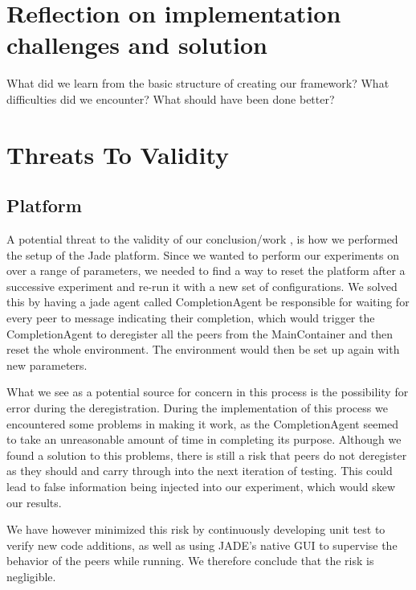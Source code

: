 \section{Reflection on implementation challenges and solution}
What did we learn from the basic structure of creating our framework?
What difficulties did we encounter?
What should have been done better? 

\section{Threats To Validity}

\subsection{Platform}
A potential threat to the validity of our conclusion/work , is how we performed the setup of the Jade platform. Since we wanted to perform our experiments on over a range of parameters, we needed to find a way to reset the platform after a successive experiment and re-run it with a new set of configurations. We solved this by having a jade agent called CompletionAgent be responsible for waiting for every peer to message indicating their completion, which would trigger the CompletionAgent to deregister all the peers from the MainContainer and then reset the whole environment. The environment would then be set up again with new parameters. 

What we see as a potential source for concern in this process is the possibility for error during the deregistration. During the implementation of this process we encountered some problems in making it work, as the CompletionAgent seemed to take an unreasonable amount of time in completing its purpose. Although we found a solution to this problems, there is still a risk that peers do not deregister as they should and carry through into the next iteration of testing. This could lead to false information being injected into our experiment, which would skew our results.  

We have however minimized this risk by continuously developing unit test to verify new code additions, as well as using JADE's native GUI to supervise the behavior of the peers while running. We therefore conclude that the risk is negligible.

